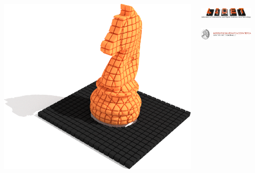 \expandafter\documentclass\expandafter[table, usenames, svgnames, dvipsnames, \classopts]{beamer}
\begin{document}
\date{}
{%
\begin{frame}
	\begin{columns}[c]
			\hspace*{-1.5em}
			\includegraphics[width=0.35\paperwidth]{side_bar.png}
			\titlepage
			\begin{center}
				\includegraphics[height=1.0cm]{lidet-logo}\\
				\includegraphics[height=1.0cm]{ime-logo}\\				
			\end{center}
	\end{columns}
\end{frame}
}
\end{document}
